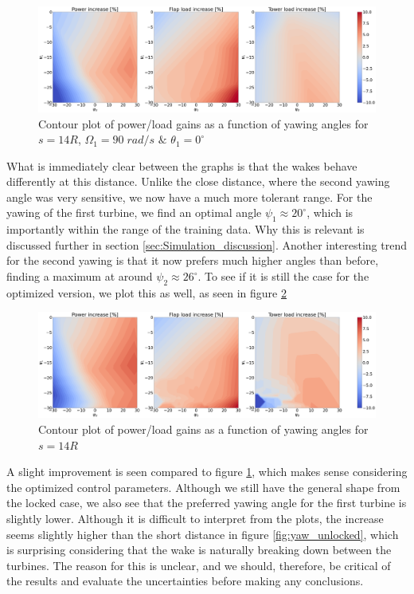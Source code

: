 \begin{figure}[H]
    \centering
    \includegraphics[scale=0.14]{Illustrations/yaw1_yaw2_14_locked.png}
    \caption{Contour plot of power/load gains as a function of yawing angles for $s=14R$, $\Omega_1=90 \; rad/s$ $\&$ $\theta_1=0^\circ$}
    \label{fig:gaincontour14r}
\end{figure}

What is immediately clear between the graphs is that the wakes behave differently at this distance. Unlike the close distance, where the second yawing angle was very sensitive, we now have a much more tolerant range. For the yawing of the first turbine, we find an optimal angle  $\psi_1 \approx 20^\circ$, which is importantly within the range of the training data. Why this is relevant is discussed further in section \ref{sec:Simulation_discussion}. Another interesting trend for the second yawing is that it now prefers much higher angles than before, finding a maximum at around $\psi_2 \approx 26^\circ$. To see if it is still the case for the optimized version, we plot this as well, as seen in figure \ref{fig:gaincontour14r_unlocked}

\begin{figure}[H]
    \centering
    \includegraphics[scale=0.14]{Illustrations/yaw1_yaw2_14_unlocked.png}
    \caption{Contour plot of power/load gains as a function of yawing angles for $s=14R$}
    \label{fig:gaincontour14r_unlocked}
\end{figure}


A slight improvement is seen compared to figure \ref{fig:gaincontour14r}, which makes sense considering the optimized control parameters. Although we still have the general shape from the locked case, we also see that the preferred yawing angle for the first turbine is slightly lower. Although it is difficult to interpret from the plots, the increase seems slightly higher than the short distance in figure \ref{fig:yaw_unlocked}, which is surprising considering that the wake is naturally breaking down between the turbines. The reason for this is unclear, and we should, therefore, be critical of the results and evaluate the uncertainties before making any conclusions.


